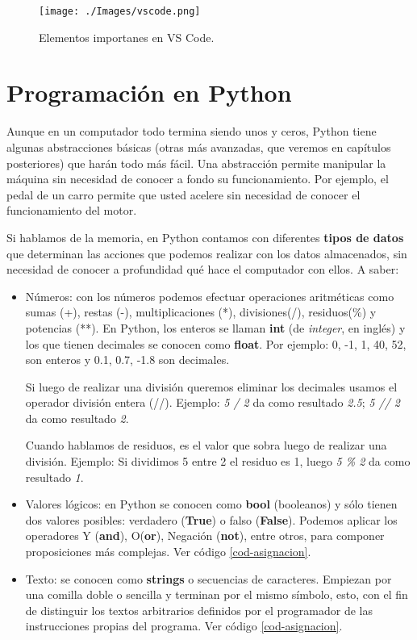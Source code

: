 \begin{figure}[h!]
	\centering
	\texttt{[image: ./Images/vscode.png]}
	\caption{Elementos importanes en VS Code.}
	\label{vscode}
\end{figure}

\section{Programación en Python}

Aunque en un computador todo termina siendo unos y ceros, Python tiene algunas abstracciones básicas (otras más avanzadas, que veremos en capítulos posteriores) que harán todo más fácil. Una abstracción permite manipular la máquina sin necesidad de conocer a fondo su funcionamiento. Por ejemplo, el pedal de un carro permite que usted acelere sin necesidad de conocer el funcionamiento del motor. 

Si hablamos de la memoria, en Python contamos con diferentes \textbf{tipos de datos} que determinan las acciones que podemos realizar con los datos almacenados, sin necesidad de conocer a profundidad qué hace el computador con ellos. A saber:

\begin{itemize}
\item Números: con los números podemos efectuar operaciones aritméticas como sumas (+), restas (-), multiplicaciones (*), divisiones(/), residuos(\%) y potencias (**). En Python, los enteros se llaman \textbf{int} (de \emph{integer}, en inglés) y los que tienen decimales se conocen como \textbf{float}. Por ejemplo: 0, -1, 1, 40, 52, son enteros y 0.1, 0.7, -1.8 son decimales. 

Si luego de realizar una división queremos eliminar los decimales usamos el operador división entera (//). Ejemplo: \emph{5 / 2} da como resultado \emph{2.5}; \emph{5 // 2} da como resultado \emph{2}.

Cuando hablamos de residuos, es el valor que sobra luego de realizar una división. Ejemplo: Si dividimos 5 entre 2 el residuo es 1, luego \emph{5 \% 2} da como resultado \emph{1}.

\item Valores lógicos: en Python se conocen como \textbf{bool} (booleanos) y sólo tienen dos valores posibles: verdadero (\textbf{True}) o falso (\textbf{False}). Podemos aplicar los operadores Y (\textbf{and}), O(\textbf{or}), Negación (\textbf{not}), entre otros, para componer proposiciones más complejas.  Ver código \ref{cod-asignacion}.

\item Texto: se conocen como \textbf{strings} o secuencias de caracteres. Empiezan por una comilla doble o sencilla y terminan por el mismo símbolo, esto, con el fin de distinguir los textos arbitrarios definidos por el programador de las instrucciones propias del programa. Ver código \ref{cod-asignacion}.
\end{itemize}

